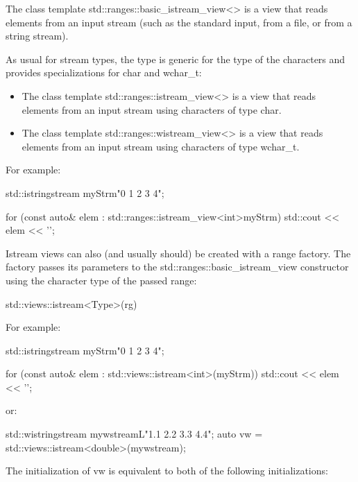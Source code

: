 The class template std::ranges::basic\_istream\_view<> is a view that reads elements from an input stream (such as the standard input, from a file, or from a string stream).

As usual for stream types, the type is generic for the type of the characters and provides specializations for char and wchar\_t:

\begin{itemize}
\item
The class template std::ranges::istream\_view<> is a view that reads elements from an input stream using characters of type char.

\item
The class template std::ranges::wistream\_view<> is a view that reads elements from an input stream using characters of type wchar\_t.
\end{itemize}

For example:

\begin{cpp}
std::istringstream myStrm{"0 1 2 3 4"};

for (const auto& elem : std::ranges::istream_view<int>{myStrm}) {
	std::cout << elem << '\n';
}
\end{cpp}


Istream views can also (and usually should) be created with a range factory. The factory passes its parameters to the std::ranges::basic\_istream\_view constructor using the character type of the passed range:

\begin{cpp}
std::views::istream<Type>(rg)
\end{cpp}

For example:

\begin{cpp}
std::istringstream myStrm{"0 1 2 3 4"};

for (const auto& elem : std::views::istream<int>(myStrm)) {
	std::cout << elem << '\n';
}
\end{cpp}

or:

\begin{cpp}
std::wistringstream mywstream{L"1.1 2.2 3.3 4.4"};
auto vw = std::views::istream<double>(mywstream);
\end{cpp}

The initialization of vw is equivalent to both of the following initializations:

